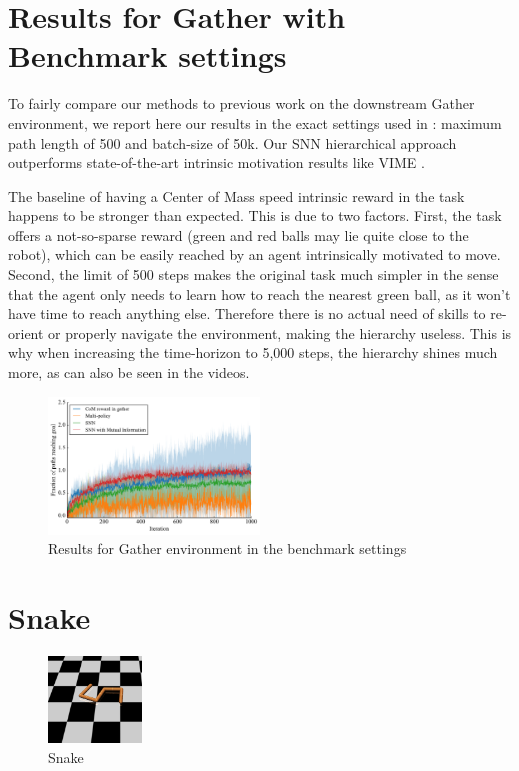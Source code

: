 \documentclass{article} %
\begin{document}
\section{Results for Gather with Benchmark settings}
\label{sec:gather_compare}
To fairly compare our methods to previous work on the downstream Gather environment, we report here our results in the exact settings used in \citet{duan2016benchmarking}: maximum path length of 500 and batch-size of 50k. Our SNN hierarchical approach outperforms state-of-the-art intrinsic motivation results like VIME \citep{houthooft2016variational}.

The baseline of having a Center of Mass speed intrinsic reward in the task happens to be stronger than expected. This is due to two factors. First, the task offers a not-so-sparse reward (green and red balls may lie quite close to the robot), which can be easily reached by an agent intrinsically motivated to move. Second, the limit of 500 steps makes the original task much simpler in the sense that the agent only needs to learn how to reach the nearest green ball, as it won't have time to reach anything else. Therefore there is no actual need of skills to re-orient or properly navigate the environment, making the hierarchy useless. This is why when increasing the time-horizon to 5,000 steps, the hierarchy shines much more, as can also be seen in the videos.

\begin{figure}[h!]
	\centering
	\label{fig:learn-gather-benchmark}
	\includegraphics[width = 0.5\textwidth]{Figures/learning-Gather.pdf}
	\caption{Results for Gather environment in the benchmark settings}
\end{figure}


\section{Snake}
\label{sec:snake}

\begin{figure}
\vspace{-20pt}
\includegraphics[trim={2cm 3cm 1cm 1.5cm}, clip, width = 2.5cm]{Figures/snake-curl.png}
\vspace{-15pt}
\caption{Snake}
\label{fig:snake-curl}
\end{figure}
\end{document}
